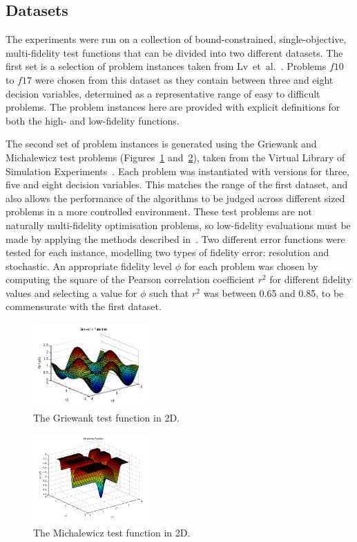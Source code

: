 \documentclass[journal]{IEEEtran}
\begin{document}
\subsection{Datasets}
The experiments were run on a collection of bound-constrained, single-objective, multi-fidelity test functions that can be divided into two different datasets. The first set is a selection of problem instances taken from Lv~et~al.~\cite{lv2021multi}. Problems $f10$ to $f17$ were chosen from this dataset as they contain between three and eight decision variables, determined as a representative range of easy to difficult problems. The problem instances here are provided with explicit definitions for both the high- and low-fidelity functions.

The second set of problem instances is generated using the Griewank and Michalewicz test problems (Figures~\ref{fig:grie} and~\ref{fig:michal}), taken from the Virtual Library of Simulation Experiments~\cite{get-citation}. Each problem was instantiated with versions for three, five and eight decision variables. This matches the range of the first dataset, and also allows the performance of the algorithms to be judged across different sized problems in a more controlled environment. These test problems are not naturally multi-fidelity optimisation problems, so low-fidelity evaluations must be made by applying the methods described in~\cite{wang2017generic}. Two different error functions were tested for each instance, modelling two types of fidelity error: resolution and stochastic. An appropriate fidelity level $\phi$ for each problem was chosen by computing the square of the Pearson correlation coefficient $r^2$ for different fidelity values and selecting a value for $\phi$ such that $r^2$ was between 0.65 and 0.85, to be commensurate with the first dataset.

\begin{figure}[h!]
  \centering
  \includegraphics[width = 0.40\textwidth]{img/griewank.png} 
  \caption{The Griewank test function in 2D.} 
    \label{fig:grie}
\end{figure}
\begin{figure}[h!]
  \centering
  \includegraphics[width = 0.40\textwidth]{img/michal.png} 
  \caption{The Michalewicz test function in 2D.} 
    \label{fig:michal}
\end{figure}
\end{document}
